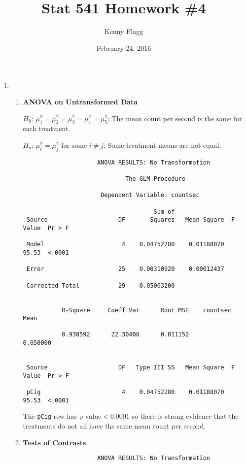 \documentclass[11pt]{article}
\title{Stat 541 Homework \#4}
\author{Kenny Flagg}
\date{February 24, 2016}
\begin{document}
\maketitle

\begin{enumerate}

\item %

\begin{enumerate}

\item %
\textbf{ANOVA on Untransformed Data}

\(H_0\): \(\mu^2_1=\mu^2_2=\mu^2_3=\mu^2_4=\mu^2_5\); The mean count per second
is the same for each treatment.

\(H_a\): \(\mu^2_i=\mu^2_j\) for some \(i\neq j\); Some treatment means are not
equal.

\begin{verbatim}
                     ANOVA RESULTS: No Transformation

                             The GLM Procedure
 
                      Dependent Variable: countsec   

                                     Sum of
 Source                    DF       Squares   Mean Square  F Value  Pr > F

 Model                      4    0.04752280    0.01188070    95.53  <.0001

 Error                     25    0.00310920    0.00012437                 

 Corrected Total           29    0.05063200                               


           R-Square     Coeff Var      Root MSE    countsec Mean

           0.938592      22.30408      0.011152         0.050000


 Source                    DF   Type III SS   Mean Square  F Value  Pr > F

 pCig                       4    0.04752280    0.01188070    95.53  <.0001
\end{verbatim}

The \verb|pCig| row has \(\text{p-value}<0.0001\) so there is strong evidence
that the treatments do not all have the same mean count per second.

\pagebreak
\item %
\textbf{Tests of Contrasts}

\begin{verbatim}
                     ANOVA RESULTS: No Transformation


\end{verbatim}
\end{enumerate}
\end{enumerate}
\end{document}
